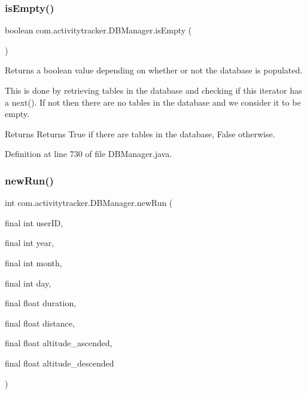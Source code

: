 \mbox{\label{classcom_1_1activitytracker_1_1_d_b_manager_af9ab112f840e3c803b6b28a2f1a15215}} 
\subsubsection{\texorpdfstring{is\+Empty()}{isEmpty()}}
{\footnotesize\ttfamily boolean com.\+activitytracker.\+D\+B\+Manager.\+is\+Empty (\begin{DoxyParamCaption}{ }\end{DoxyParamCaption})\hspace{0.3cm}{\ttfamily [private]}}

Returns a boolean value depending on whether or not the database is populated.

This is done by retrieving tables in the database and checking if this iterator has a next(). If not then there are no tables in the database and we consider it to be empty.

\begin{DoxyReturn}{Returns}
Returns True if there are tables in the database, False otherwise. 
\end{DoxyReturn}


Definition at line 730 of file D\+B\+Manager.\+java.

\mbox{\label{classcom_1_1activitytracker_1_1_d_b_manager_a05b742f583167f6ce00eb8415c43fc1c}} 
\subsubsection{\texorpdfstring{new\+Run()}{newRun()}}
{\footnotesize\ttfamily int com.\+activitytracker.\+D\+B\+Manager.\+new\+Run (\begin{DoxyParamCaption}\item[{final int}]{user\+ID,  }\item[{final int}]{year,  }\item[{final int}]{month,  }\item[{final int}]{day,  }\item[{final float}]{duration,  }\item[{final float}]{distance,  }\item[{final float}]{altitude\+\_\+ascended,  }\item[{final float}]{altitude\+\_\+descended }\end{DoxyParamCaption})}

